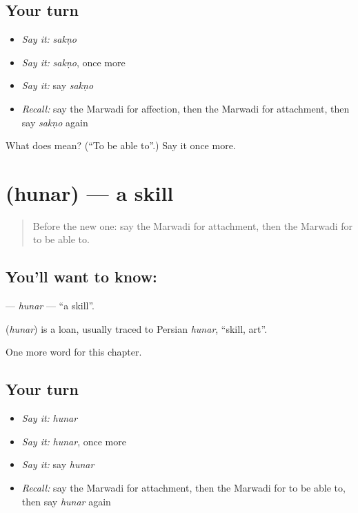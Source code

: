 \subsection*{Your turn}
\begin{itemize}
\raggedright
  \item \emph{Say it:} \emph{sakṇo}
  \item \emph{Say it:} \emph{sakṇo}, once more
  \item \emph{Say it:} say \emph{sakṇo}
  \item \emph{Recall:} say the Marwadi for affection, then the Marwadi for attachment, then say \emph{sakṇo} again
\end{itemize}

\begin{tcolorbox}[breakable,colback=teal!4,colframe=teal!35!black,title={Before you move on}]
What does  mean? (\textquotedblleft{}To be able to\textquotedblright{}.) Say it once more.
\end{tcolorbox}
\section[\texorpdfstring{\mw{हुनर} (hunar)}{हुनर (hunar)}]{ (hunar) — a skill}

\label{lesson:MW-C114-hunar}



\begin{quote}
Before the new one: say the Marwadi for attachment, then the Marwadi for to be able to.
\end{quote}

\subsection*{You'll want to know: }
\textbf{} — \emph{hunar} — \textquotedblleft{}a skill\textquotedblright{}.

\begin{cousinweb}
\textbf{} (\emph{hunar}) is a loan, usually traced to Persian \emph{hunar}, \textquotedblleft{}skill, art\textquotedblright{}.
\end{cousinweb}

\begin{grammarlens}[title={What you've built}]
One more word for this chapter.
\end{grammarlens}

\subsection*{Your turn}
\begin{itemize}
\raggedright
  \item \emph{Say it:} \emph{hunar}
  \item \emph{Say it:} \emph{hunar}, once more
  \item \emph{Say it:} say \emph{hunar}
  \item \emph{Recall:} say the Marwadi for attachment, then the Marwadi for to be able to, then say \emph{hunar} again
\end{itemize}

